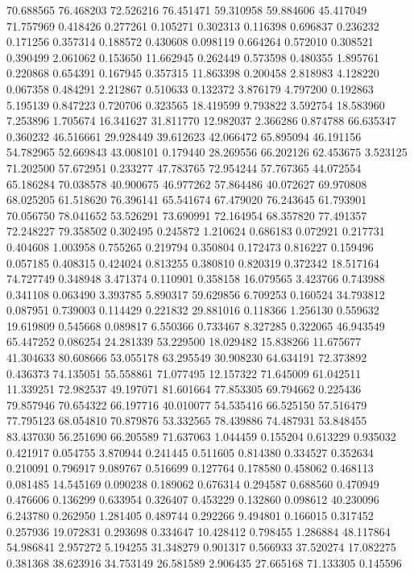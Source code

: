 70.688565
76.468203
72.526216
76.451471
59.310958
59.884606
45.417049
71.757969
0.418426
0.277261
0.105271
0.302313
0.116398
0.696837
0.236232
0.171256
0.357314
0.188572
0.430608
0.098119
0.664264
0.572010
0.308521
0.390499
2.061062
0.153650
11.662945
0.262449
0.573598
0.480355
1.895761
0.220868
0.654391
0.167945
0.357315
11.863398
0.200458
2.818983
4.128220
0.067358
0.484291
2.212867
0.510633
0.132372
3.876179
4.797200
0.192863
5.195139
0.847223
0.720706
0.323565
18.419599
9.793822
3.592754
18.583960
7.253896
1.705674
16.341627
31.811770
12.982037
2.366286
0.874788
66.635347
0.360232
46.516661
29.928449
39.612623
42.066472
65.895094
46.191156
54.782965
52.669843
43.008101
0.179440
28.269556
66.202126
62.453675
3.523125
71.202500
57.672951
0.233277
47.783765
72.954244
57.767365
44.072554
65.186284
70.038578
40.900675
46.977262
57.864486
40.072627
69.970808
68.025205
61.518620
76.396141
65.541674
67.479020
76.243645
61.793901
70.056750
78.041652
53.526291
73.690991
72.164954
68.357820
77.491357
72.248227
79.358502
0.302495
0.245872
1.210624
0.686183
0.072921
0.217731
0.404608
1.003958
0.755265
0.219794
0.350804
0.172473
0.816227
0.159496
0.057185
0.408315
0.424024
0.813255
0.380810
0.820319
0.372342
18.517164
74.727749
0.348948
3.471374
0.110901
0.358158
16.079565
3.423766
0.743988
0.341108
0.063490
3.393785
5.890317
59.629856
6.709253
0.160524
34.793812
0.087951
0.739003
0.114429
0.221832
29.881016
0.118366
1.256130
0.559632
19.619809
0.545668
0.089817
6.550366
0.733467
8.327285
0.322065
46.943549
65.447252
0.086254
24.281339
53.229500
18.029482
15.838266
11.675677
41.304633
80.608666
53.055178
63.295549
30.908230
64.634191
72.373892
0.436373
74.135051
55.558861
71.077495
12.157322
71.645009
61.042511
11.339251
72.982537
49.197071
81.601664
77.853305
69.794662
0.225436
79.857946
70.654322
66.197716
40.010077
54.535416
66.525150
57.516479
77.795123
68.054810
70.879876
53.332565
78.439886
74.487931
53.848455
83.437030
56.251690
66.205589
71.637063
1.044459
0.155204
0.613229
0.935032
0.421917
0.054755
3.870944
0.241445
0.511605
0.814380
0.334527
0.352634
0.210091
0.796917
9.089767
0.516699
0.127764
0.178580
0.458062
0.468113
0.081485
14.545169
0.090238
0.189062
0.676314
0.294587
0.688560
0.470949
0.476606
0.136299
0.633954
0.326407
0.453229
0.132860
0.098612
40.230096
6.243780
0.262950
1.281405
0.489744
0.292266
9.494801
0.166015
0.317452
0.257936
19.072831
0.293698
0.334647
10.428412
0.798455
1.286884
48.117864
54.986841
2.957272
5.194255
31.348279
0.901317
0.566933
37.520274
17.082275
0.381368
38.623916
34.753149
26.581589
2.906435
27.665168
71.133305
0.145596
